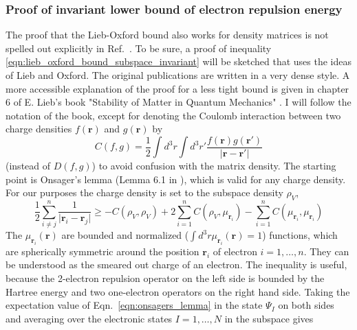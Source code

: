 \documentclass[journal=jpca,manuscript=article,layout=singlecolumn]{achemso}
\renewcommand\vec[1]{\mathbf{#1}}
\begin{document}


\subsubsection{Proof of  invariant lower bound of electron repulsion energy}
\label{sec:lieb_oxford_bound_electron_repulsion}
The proof that the Lieb-Oxford bound also works for density matrices is not spelled out explicitly in Ref.~\cite{Lieb1981}. To be sure, a proof
of inequality \ref{eqn:lieb_oxford_bound_subspace_invariant} will be sketched that uses the ideas of Lieb and Oxford. The original publications
\cite{Lieb1979,Lieb1981} are written in a very dense style. A more accessible explanation of the proof
for a less tight bound is given in chapter 6 of E. Lieb's book "Stability of Matter in Quantum Mechanics" \cite{Lieb2010_Stability_of_Matter}.
I will follow the notation of the book, except for denoting the Coulomb interaction between two charge densities
$f(\vec{r})$ and $g(\vec{r})$ by 
\begin{equation}
  C(f,g) = \frac{1}{2} \int d^3r \int d^3r' \frac{f(\vec{r}) g(\vec{r}')}{\vert \vec{r} - \vec{r}' \vert}
\end{equation}
(instead of $D(f,g)$) to avoid confusion with the matrix density. The starting point is Onsager's lemma
(Lemma 6.1 in \cite{Lieb2010_Stability_of_Matter}), which is valid for any charge density. For our purposes the
charge density is set to the subspace density $\rho_V$,
\begin{equation}
\frac{1}{2} \sum_{i \neq j}^n \frac{1}{\vert \vec{r}_i - \vec{r}_j \vert}
\geq - C(\rho_V,\rho_V) + 2 \sum_{i=1}^n C(\rho_V, \mu_{\vec{r}_i}) - \sum_{i=1}^{n} C(\mu_{\vec{r}_i},\mu_{\vec{r}_i}) \label{eqn:onsagers_lemma}
\end{equation}
The $\mu_{\vec{r}_i}(\vec{r})$ are bounded and normalized ($\int d^3r \mu_{\vec{r}_i}(\vec{r}) = 1$) functions, which are
spherically symmetric around the position $\vec{r}_i$ of electron $i=1,\ldots,n$.
They can be understood as the smeared out charge of an electron. The inequality is useful, because
the 2-electron repulsion operator on the left side is bounded by the Hartree energy and two one-electron operators on the right hand side. \cite{Lieb2010_Stability_of_Matter}
Taking the expectation value of Eqn.~\ref{eqn:onsagers_lemma} in the state $\Psi_I$ on both sides and averaging over the electronic states $I=1,\ldots,N$
in the subspace gives
\end{document}
